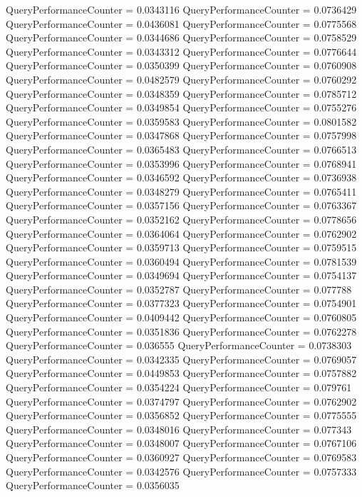 \documentclass[9pt]{article}
\theoremstyle{plain}
\theoremstyle{definition}
\theoremstyle{remark}
\numberwithin{equation}{section}
\begin{document}
QueryPerformanceCounter  =  0.0343116
QueryPerformanceCounter  =  0.0736429
QueryPerformanceCounter  =  0.0436081
QueryPerformanceCounter  =  0.0775568
QueryPerformanceCounter  =  0.0344686
QueryPerformanceCounter  =  0.0758529
QueryPerformanceCounter  =  0.0343312
QueryPerformanceCounter  =  0.0776644
QueryPerformanceCounter  =  0.0350399
QueryPerformanceCounter  =  0.0760908
QueryPerformanceCounter  =  0.0482579
QueryPerformanceCounter  =  0.0760292
QueryPerformanceCounter  =  0.0348359
QueryPerformanceCounter  =  0.0785712
QueryPerformanceCounter  =  0.0349854
QueryPerformanceCounter  =  0.0755276
QueryPerformanceCounter  =  0.0359583
QueryPerformanceCounter  =  0.0801582
QueryPerformanceCounter  =  0.0347868
QueryPerformanceCounter  =  0.0757998
QueryPerformanceCounter  =  0.0365483
QueryPerformanceCounter  =  0.0766513
QueryPerformanceCounter  =  0.0353996
QueryPerformanceCounter  =  0.0768941
QueryPerformanceCounter  =  0.0346592
QueryPerformanceCounter  =  0.0736938
QueryPerformanceCounter  =  0.0348279
QueryPerformanceCounter  =  0.0765411
QueryPerformanceCounter  =  0.0357156
QueryPerformanceCounter  =  0.0763367
QueryPerformanceCounter  =  0.0352162
QueryPerformanceCounter  =  0.0778656
QueryPerformanceCounter  =  0.0364064
QueryPerformanceCounter  =  0.0762902
QueryPerformanceCounter  =  0.0359713
QueryPerformanceCounter  =  0.0759515
QueryPerformanceCounter  =  0.0360494
QueryPerformanceCounter  =  0.0781539
QueryPerformanceCounter  =  0.0349694
QueryPerformanceCounter  =  0.0754137
QueryPerformanceCounter  =  0.0352787
QueryPerformanceCounter  =  0.077788
QueryPerformanceCounter  =  0.0377323
QueryPerformanceCounter  =  0.0754901
QueryPerformanceCounter  =  0.0409442
QueryPerformanceCounter  =  0.0760805
QueryPerformanceCounter  =  0.0351836
QueryPerformanceCounter  =  0.0762278
QueryPerformanceCounter  =  0.036555
QueryPerformanceCounter  =  0.0738303
QueryPerformanceCounter  =  0.0342335
QueryPerformanceCounter  =  0.0769057
QueryPerformanceCounter  =  0.0449853
QueryPerformanceCounter  =  0.0757882
QueryPerformanceCounter  =  0.0354224
QueryPerformanceCounter  =  0.079761
QueryPerformanceCounter  =  0.0374797
QueryPerformanceCounter  =  0.0762902
QueryPerformanceCounter  =  0.0356852
QueryPerformanceCounter  =  0.0775555
QueryPerformanceCounter  =  0.0348016
QueryPerformanceCounter  =  0.077343
QueryPerformanceCounter  =  0.0348007
QueryPerformanceCounter  =  0.0767106
QueryPerformanceCounter  =  0.0360927
QueryPerformanceCounter  =  0.0769583
QueryPerformanceCounter  =  0.0342576
QueryPerformanceCounter  =  0.0757333
QueryPerformanceCounter  =  0.0356035
\end{document}
